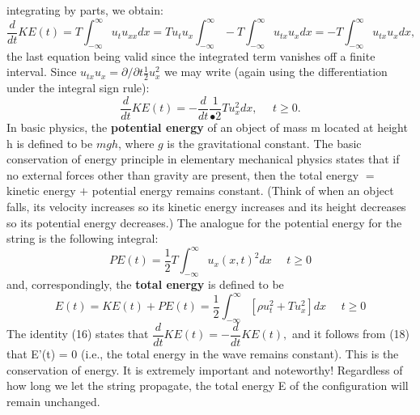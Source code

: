 \documentclass[../main.tex]{subfiles}
\begin{document}
integrating by parts, we obtain:
$$
\frac{d}{dt} KE(t)=T \int_{-\infty}^{\infty} u_t u_{xx} dx=Tu_t u_x \int_{-\infty}^{\infty} -T \int_{-\infty}^{\infty} u_{tx} u_x dx =-T \int_{-\infty}^{\infty} u_{tx} u_x dx,
$$
the last equation being valid since the integrated term vanishes off a finite interval. Since $u_{tx} u_x = \partial / \partial t \frac{1}{2} u_x^2$ we may write (again using the differentiation under the 
integral sign rule):
\begin{equation} \label{eqa16}
\dfrac{d}{dt} KE(t)= -\dfrac{d}{dt}  \dfrac{1}{•2} Tu_{x}^{2} dx, ~~~~~~t\geq 0.
\end{equation}
In basic physics, the \textbf{potential energy} of an object of mass m located at height h is 
defined to be $mgh$, where $g$ is the gravitational constant. The basic conservation of 
energy principle in elementary mechanical physics states that if no external forces 
other than gravity are present, then the total energy $=$ kinetic energy $+$ potential 
energy remains constant. (Think of when an object falls, its velocity increases so 
its kinetic energy increases and its height decreases so its potential energy 
decreases.) The analogue for the potential energy for the string is the following 
integral: 
\begin{equation}\label{eqa17}
PE(t)=\dfrac{1}{2} T \int_{-\infty}^{\infty} u_x (x,t)^2 dx ~~~~~~t\geq 0
\end{equation}
and, correspondingly, the \textbf{total energy} is defined to be
\begin{equation} \label{eqa18}
E(t)=KE(t)+PE(t)=\dfrac{1}{2} \int_{-\infty}^{\infty} [\rho u_t^2 + Tu_x^2] dx ~~~~~~t\geq 0
\end{equation}
The identity (16) states that $\dfrac{d}{dt} KE(t)=-\dfrac{d}{dt} KE(t),$ and it follows from (18) that E'(t) = 0 (i.e., the total energy in the wave remains constant). This is the 
conservation of energy. It is extremely important and noteworthy! Regardless of 
how long we let the string propagate, the total energy E of the configuration will 
remain unchanged. 
\\
\\
\end{document}
